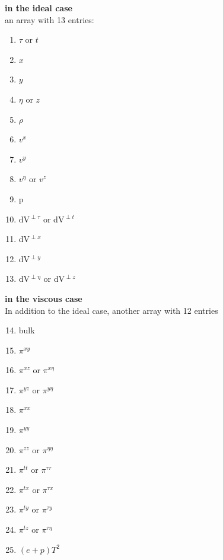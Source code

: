 \begin{minipage}[t]{0.45\textwidth}
\textbf{in the ideal case}\\
an array with 13 entries:\\
\begin{enumerate}
 \item $\tau$ or $t$
 \item $x$ 
 \item $y$ 
 \item $\eta$ or $z$
 \item $\rho$
 \item $v^x$
 \item $v^y$
 \item $v^\eta$ or $v^z$
 \item p
 \item dV$^{\perp \tau}$ or  dV$^{\perp t}$
 \item dV$^{\perp x}$
 \item dV$^{\perp y}$
 \item dV$^{\perp \eta}$ or  dV$^{\perp z}$
\end{enumerate}
\end{minipage}\:
\begin{minipage}[t]{0.45\textwidth}
\textbf{in the viscous case}\\
In addition to the ideal case, another array with 12 entries
\begin{enumerate}\setcounter{enumi}{13}
\item bulk
\item $\pi^{xy}$
\item $\pi^{xz}$ or  $\pi^{x\eta}$
\item $\pi^{yz}$ or  $\pi^{y\eta}$
\item $\pi^{xx}$
\item $\pi^{yy}$
\item $\pi^{zz}$ or  $\pi^{\eta \eta}$
\item $\pi^{tt}$ or  $\pi^{\tau \tau}$
\item $\pi^{tx}$ or  $\pi^{\tau x}$
\item $\pi^{ty}$ or  $\pi^{\tau y}$
\item $\pi^{tz}$ or  $\pi^{\tau \eta}$
\item $(e+p)T^2$  
\end{enumerate}
\end{minipage}\\


